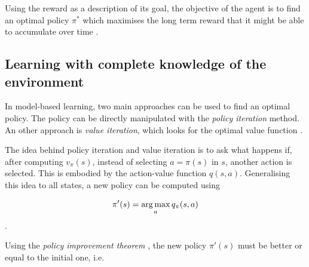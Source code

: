  
 
Using the reward as a description of its goal, the objective of the agent is to find an optimal policy $\pi^*$ which maximises the long term reward that it might be able to accumulate over time \cite{yves_glorennec_reinforcement_2001}.

\subsection{Learning with complete knowledge of the environment}
\label{sec:complete_knowledge}
 
In model-based learning, two main approaches can be used to find an optimal policy. The policy can be directly manipulated with the \textit{policy iteration} method. An other approach is \textit{value iteration}, which looks for the optimal value function \cite{yves_glorennec_reinforcement_2001}.

The idea behind policy iteration and value iteration is to ask what happens if, after computing $v_{\pi}(s)$, instead of selecting $a=\pi(s)$ in $s$, another action is selected. This is embodied by the action-value function $q(s,a)$. Generalising this idea to all states, a new policy can be computed using

\begin{equation}
\label{eq:policy_improvement}
 \pi'(s) = \operatorname*{arg\,max}_a q_{\pi}(s, a)
\end{equation}.

Using the \textit{policy improvement theorem} \cite[p.~78]{sutton_reinforcement_1998}, the new policy $\pi'(s)$ must be better or equal to the initial one, i.e.


